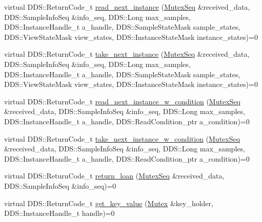 \begin{DoxyCompactItemize}
\item 
virtual DDS::ReturnCode\_\-t \hyperlink{classKnowledge_1_1MutexDataReaderView_a86f7da40f5dd238bd7563583c3775358}{read\_\-next\_\-instance} (\hyperlink{namespaceKnowledge_a3165529aa87299c6a92754fbd7eeeff4}{MutexSeq} \&received\_\-data, DDS::SampleInfoSeq \&info\_\-seq, DDS::Long max\_\-samples, DDS::InstanceHandle\_\-t a\_\-handle, DDS::SampleStateMask sample\_\-states, DDS::ViewStateMask view\_\-states, DDS::InstanceStateMask instance\_\-states)=0
\item 
virtual DDS::ReturnCode\_\-t \hyperlink{classKnowledge_1_1MutexDataReaderView_ace1e95e5fd64380943add90a846b73f2}{take\_\-next\_\-instance} (\hyperlink{namespaceKnowledge_a3165529aa87299c6a92754fbd7eeeff4}{MutexSeq} \&received\_\-data, DDS::SampleInfoSeq \&info\_\-seq, DDS::Long max\_\-samples, DDS::InstanceHandle\_\-t a\_\-handle, DDS::SampleStateMask sample\_\-states, DDS::ViewStateMask view\_\-states, DDS::InstanceStateMask instance\_\-states)=0
\item 
virtual DDS::ReturnCode\_\-t \hyperlink{classKnowledge_1_1MutexDataReaderView_a5d9ca32089c731fffe4fd29c19137a77}{read\_\-next\_\-instance\_\-w\_\-condition} (\hyperlink{namespaceKnowledge_a3165529aa87299c6a92754fbd7eeeff4}{MutexSeq} \&received\_\-data, DDS::SampleInfoSeq \&info\_\-seq, DDS::Long max\_\-samples, DDS::InstanceHandle\_\-t a\_\-handle, DDS::ReadCondition\_\-ptr a\_\-condition)=0
\item 
virtual DDS::ReturnCode\_\-t \hyperlink{classKnowledge_1_1MutexDataReaderView_ad3d8ffab06e256e1c132a36ab4bc3f83}{take\_\-next\_\-instance\_\-w\_\-condition} (\hyperlink{namespaceKnowledge_a3165529aa87299c6a92754fbd7eeeff4}{MutexSeq} \&received\_\-data, DDS::SampleInfoSeq \&info\_\-seq, DDS::Long max\_\-samples, DDS::InstanceHandle\_\-t a\_\-handle, DDS::ReadCondition\_\-ptr a\_\-condition)=0
\item 
virtual DDS::ReturnCode\_\-t \hyperlink{classKnowledge_1_1MutexDataReaderView_a97b8e65b22267416edd526267d4d2b4f}{return\_\-loan} (\hyperlink{namespaceKnowledge_a3165529aa87299c6a92754fbd7eeeff4}{MutexSeq} \&received\_\-data, DDS::SampleInfoSeq \&info\_\-seq)=0
\item 
virtual DDS::ReturnCode\_\-t \hyperlink{classKnowledge_1_1MutexDataReaderView_af040a4e537450dfe73da0fd928450b6d}{get\_\-key\_\-value} (\hyperlink{structKnowledge_1_1Mutex}{Mutex} \&key\_\-holder, DDS::InstanceHandle\_\-t handle)=0
\end{DoxyCompactItemize}
